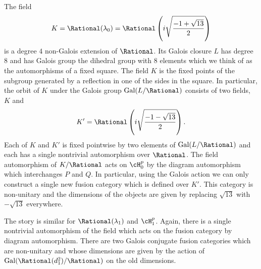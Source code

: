 
The field $$K = \Rational(\lambda_0) = \Rational\left(i\sqrt{\frac{-1+\sqrt{13}}{2}}\right)$$ is a degree $4$ non-Galois extension of $\Rational$.  Its Galois closure $L$ has degree $8$ and has Galois group the dihedral group with $8$ elements which we think of as the automorphisms of a fixed square.  The field $K$ is the fixed points of the subgroup generated by a reflection in one of the sides in the square.  In particular, the orbit of $K$ under the Galois group $\text{Gal}(L/\Rational)$ consists of two fields, $K$ and $$K' = \Rational\left(i\sqrt{\frac{-1-\sqrt{13}}{2}}\right).$$  Each of $K$ and $K'$ is fixed pointwise by two elements of $\text{Gal}(L/\Rational)$ and each has a single nontrivial automorphism over $\Rational$.  The field automorphism of $K/\Rational$ acts on $\cH_0^p$ by the diagram automorphism which interchanges $P$ and $Q$.  In particular, using the Galois action we can only construct a single new fusion category which is defined over $K'$.  This category is non-unitary and the dimensions of the objects are given by replacing $\sqrt{13}$ with $-\sqrt{13}$ everywhere.

The story is similar for $ \Rational(\lambda_1)$ and $\cH_1^p$. Again, there is a single nontrivial automorphism of the field which acts on the fusion category by diagram automorphism.  There are two Galois conjugate fusion categories which are non-unitary and whose dimensions are given by the action of $\text{Gal}(\Rational(d_1^2)/\Rational)$ on the old dimensions.